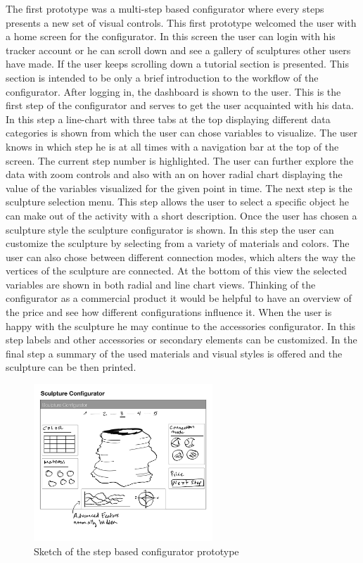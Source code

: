 \documentclass[../medieninformatik-arbeit.tex]{subfiles}
\begin{document}
The first prototype was a multi-step based configurator where every steps presents a new set of visual controls. This first prototype welcomed the user with a home screen for the configurator. In this screen the user can login with his tracker account or he can scroll down and see a gallery of sculptures other users have made. If the user keeps scrolling down a tutorial section is presented. This section is intended to be only a brief introduction to the workflow of the configurator. After logging in, the dashboard is shown to the user. This is the first step of the configurator and serves to get the user acquainted with his data. In this step a line-chart with three tabs at the top displaying different data categories is shown from which the user can chose variables to visualize. The user knows in which step he is at all times with a navigation bar at the top of the screen. The current step number is highlighted. The user can further explore the data with zoom controls and also with an on hover radial chart displaying the value of the variables visualized for the given point in time. The next step is the sculpture selection menu. This step allows the user to select a specific object he can make out of the activity with a short description. Once the user has chosen a sculpture style the sculpture configurator is shown. In this step the user can customize the sculpture by selecting from a variety of materials and colors. The user can also chose between different connection modes, which alters the way the vertices of the sculpture are connected. At the bottom of this view the selected variables are shown in both radial and line chart views. Thinking of the configurator as a commercial product it would be helpful to have an overview of the price and see how different configurations influence it. When the user is happy with the sculpture he may continue to the accessories configurator. In this step labels and other accessories or secondary elements can be customized. In the final step a summary of the used materials and visual styles is offered and the sculpture can be then printed. 

\begin{figure}[h]
\captionsetup{width=0.7\textwidth}
\begin{center}
  \includegraphics[width=0.6\textwidth,trim=0mm 24mm 0mm 0mm,clip=true]{Prototype/img/ui_proto1}
  \caption{Sketch of the step based configurator prototype}
\label{fig:uiproto1}
\end{center}
\end{figure}
\end{document}
